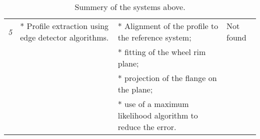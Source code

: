 \begin{table}[t!]
\begin{tabular}{|l|p{4cm}|p{4cm}|l|}
\hline
\textit{5}  & * Profile extraction using edge detector algorithms.               & * Alignment of the profile to the reference system;                      & Not found               \\
            &                                                                    & * fitting of the wheel rim plane;                                        &                         \\
            &                                                                    & * projection of the flange on the plane;                                 &                         \\
            &                                                                    & * use of a maximum likelihood algorithm to reduce the error.             &                         \\
\hline
\end{tabular}

\caption{Summery of the systems above.}
\label{tab:wpms:summaries}
\end{table}